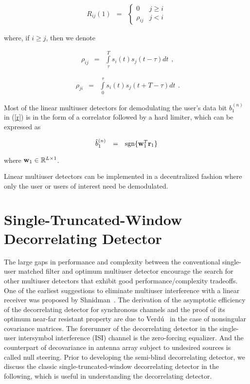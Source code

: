 \documentclass[a4paper,11pt,fleqn]{article}
\newcommand{\br}{{\mathbf r}}
\newcommand{\bw}{{\bf w}}
\begin{document}
\begin{equation}
\begin{array}{rcl}
R_{ij}(1)&=&\left\{
\begin{array}{ll}
0&j\geq i\\ \rho_{ij}&j<i
\end{array}\right.
\end{array}
\end{equation}

\noindent where, if $i\ge j$, then we denote

\begin{equation}
\begin{array}{rcl}
\rho_{ij}&=&\int\limits_{\tau}^{T}s_i(t)s_j(t-\tau)dt
\end{array},
\end{equation}

\begin{equation}
\begin{array}{rcl}
\rho_{ji}&=&\int\limits_{0}^{\tau}s_i(t)s_j(t+T-\tau)dt
\end{array}.
\end{equation}

Most of the linear multiuser detectors for demodulating the user's
data bit $b_1^{(n)}$ in (\ref{r}) is in the form of a correlator
followed by a hard limiter, which can be expressed as

\begin{equation}
\begin{array}{rcl}
\hat{b}_1^{(n)} &=& \mbox{sgn}\{\bw_1^T\br_1\}
\end{array} \label{linear}
\end{equation}

\noindent where $\bw_1 \in \mathbb{R}^{L\times 1}$.

Linear multiuser detectors can be implemented in a decentralized
fashion where only the user or users of interest need be
demodulated.

\section{Single-Truncated-Window Decorrelating Detector}

The large gaps in performance and complexity between the
conventional single-user matched filter and optimum multiuser
detector encourage the search for other multiuser detectors that
exhibit good performance/complexity tradeoffs. One of the earliest
suggestions to eliminate multiuser interference with a linear
receiver was proposed by Shnidman~\cite{Shni67}. The derivation of
the asymptotic efficiency of the decorrelating detector for
synchronous channels and the proof of its optimum near-far
resistant property are due to Verd\'{u}~\cite{Verd86} in the case
of nonsingular covariance matrices. The forerunner of the
decorrelating detector in the single-user intersymbol interference
(ISI) channel is the zero-forcing equalizer. And the counterpart
of decovariance in antenna array subject to undesired sources is
called null steering. Prior to developing the semi-blind
decorrelating detector, we discuss the classic
single-truncated-window decorrelating detector in the following,
which is useful in understanding the decorrelating detector.
\end{document}
